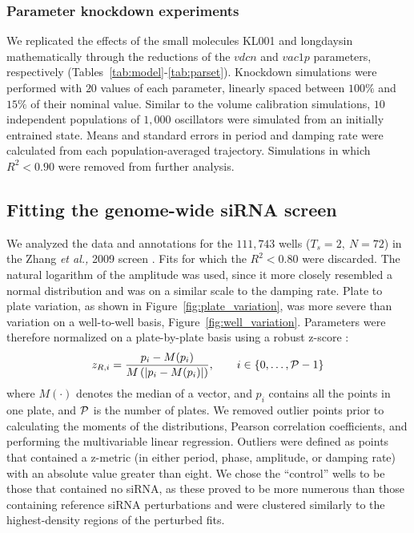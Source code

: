 \documentclass[11pt, letterpaper]{article}
\begin{document}
\subsubsection*{Parameter knockdown experiments}
We replicated the effects of the small molecules KL001 and longdaysin mathematically through the reductions of the $vdcn$ and $vac1p$ parameters, respectively (Tables~\ref{tab:model}-\ref{tab:parset}).
Knockdown simulations were performed with $20$ values of each parameter, linearly spaced between $100\%$ and $15\%$ of their nominal value.
Similar to the volume calibration simulations, $10$ independent populations of $1,000$ oscillators were simulated from an initially entrained state.
Means and standard errors in period and damping rate were calculated from each population-averaged trajectory.
Simulations in which $R^2 < 0.90$ were removed from further analysis.

\subsection*{Fitting the genome-wide siRNA screen}
We analyzed the data and annotations for the $111,743$ wells ($T_s = 2,\ N = 72$) in the Zhang {\itshape et al.,} 2009 screen \cite{Zhang2009}.
Fits for which the $R^2 < 0.80$ were discarded.
The natural logarithm of the amplitude was used, since it more closely resembled a normal distribution and was on a similar scale to the damping rate.
Plate to plate variation, as shown in Figure~\ref{fig:plate_variation}, was more severe than variation on a well-to-well basis, Figure~\ref{fig:well_variation}.
Parameters were therefore normalized on a plate-by-plate basis using a robust z-score \cite{Birmingham2009}:
\[
  z_{R,i} = \frac{p_i - M(p_i)}{M\left(\left|p_i - M(p_i)\right|\right)}, \qquad i \in \{0, \dots, {\cal P} - 1 \}
\]
where $M(\cdot)$ denotes the median of a vector, and $p_i$ contains all the points in one plate, and $\cal P$ is the number of plates.
We removed outlier points prior to calculating the moments of the distributions, Pearson correlation coefficients, and performing the multivariable linear regression.
Outliers were defined as points that contained a z-metric (in either period, phase, amplitude, or damping rate) with an absolute value greater than eight.
We chose the ``control'' wells to be those that contained no siRNA, as these proved to be more numerous than those containing reference siRNA perturbations and were clustered similarly to the highest-density regions of the perturbed fits.
\end{document}
